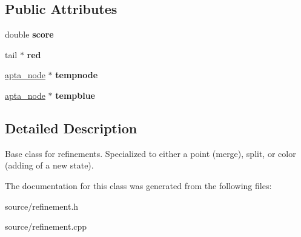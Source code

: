 \subsection*{Public Attributes}
\begin{DoxyCompactItemize}
\item 
\mbox{\label{classrefinement_a024cfbac56c02c168736c38f17f0a197}} 
double {\bfseries score}
\item 
\mbox{\label{classrefinement_af4949e43e585b8b0778c1406b11c4e77}} 
tail $\ast$ {\bfseries red}
\item 
\mbox{\label{classrefinement_a8ad8cc493424451b9be9f7579e0348bb}} 
\hyperlink{classapta__node}{apta\+\_\+node} $\ast$ {\bfseries tempnode}
\item 
\mbox{\label{classrefinement_a1707602bfb1bbffb37a38e8bee7d9986}} 
\hyperlink{classapta__node}{apta\+\_\+node} $\ast$ {\bfseries tempblue}
\end{DoxyCompactItemize}


\subsection{Detailed Description}
Base class for refinements. Specialized to either a point (merge), split, or color (adding of a new state). 

The documentation for this class was generated from the following files\+:\begin{DoxyCompactItemize}
\item 
source/refinement.\+h\item 
source/refinement.\+cpp\end{DoxyCompactItemize}
